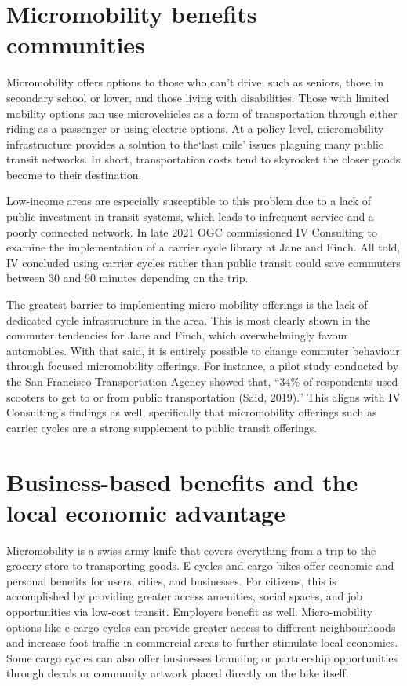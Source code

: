 \documentclass[letter]{ourGreenwayBrand}
\begin{document}
\section{Micromobility benefits communities}
Micromobility offers options to those who can’t drive; such as seniors, those in secondary school or lower, and those living with disabilities. Those with limited mobility options can use microvehicles as a form of transportation through either riding as a passenger or using electric options. At a policy level, micromobility infrastructure provides a solution to the‘last mile’ issues plaguing many public transit networks. In short, transportation costs tend to skyrocket the closer goods become to their destination.

Low-income areas are especially susceptible to this problem due to a lack of public investment in transit systems, which leads to infrequent service and a poorly connected network. In late 2021 OGC commissioned IV Consulting to examine the implementation of a carrier cycle library at Jane and Finch. All told, IV concluded using carrier cycles rather than public transit could save commuters between 30 and 90 minutes depending on the trip.

The greatest barrier to implementing micro-mobility offerings is the lack of dedicated cycle infrastructure in the area. This is most clearly shown in the commuter tendencies for Jane and Finch, which overwhelmingly favour automobiles. With that said, it is entirely possible to change commuter behaviour through focused micromobility offerings. For instance, a pilot study conducted by the San Francisco Transportation Agency showed that, “34\% of respondents used scooters to get to or from public transportation (Said, 2019).” This aligns with IV Consulting’s findings as well, specifically that micromobility offerings such as carrier cycles are a strong supplement to public transit offerings.

\section{Business-based benefits and the local economic advantage}
Micromobility is a swiss army knife that covers everything from a trip to the grocery store to transporting goods. E-cycles and cargo bikes offer economic and personal benefits for users, cities, and businesses. For citizens, this is accomplished by providing greater access amenities, social spaces, and job opportunities via low-cost transit. Employers benefit as well. Micro-mobility options like e-cargo cycles can provide greater access to different neighbourhoods and increase foot traffic in commercial areas to further stimulate local economies. Some cargo cycles can also offer businesses branding or partnership opportunities through decals or community artwork placed directly on the bike itself.
\end{document}
